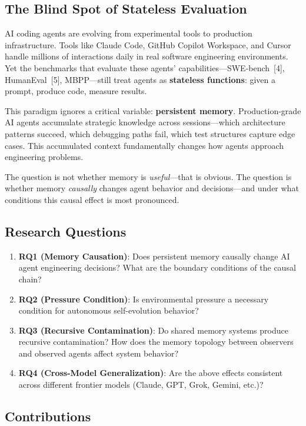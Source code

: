\documentclass[11pt, a4paper]{article}
\begin{document}
\subsection{The Blind Spot of Stateless Evaluation}

AI coding agents are evolving from experimental tools to production infrastructure. Tools like Claude Code, GitHub Copilot Workspace, and Cursor handle millions of interactions daily in real software engineering environments. Yet the benchmarks that evaluate these agents' capabilities---SWE-bench~[4], HumanEval~[5], MBPP---still treat agents as \textbf{stateless functions}: given a prompt, produce code, measure results.

This paradigm ignores a critical variable: \textbf{persistent memory}. Production-grade AI agents accumulate strategic knowledge across sessions---which architecture patterns succeed, which debugging paths fail, which test structures capture edge cases. This accumulated context fundamentally changes how agents approach engineering problems.

The question is not whether memory is \textit{useful}---that is obvious. The question is whether memory \textit{causally} changes agent behavior and decisions---and under what conditions this causal effect is most pronounced.

\subsection{Research Questions}

\begin{enumerate}
  \item \textbf{RQ1 (Memory Causation)}: Does persistent memory causally change AI agent engineering decisions? What are the boundary conditions of the causal chain?
  \item \textbf{RQ2 (Pressure Condition)}: Is environmental pressure a necessary condition for autonomous self-evolution behavior?
  \item \textbf{RQ3 (Recursive Contamination)}: Do shared memory systems produce recursive contamination? How does the memory topology between observers and observed agents affect system behavior?
  \item \textbf{RQ4 (Cross-Model Generalization)}: Are the above effects consistent across different frontier models (Claude, GPT, Grok, Gemini, etc.)?
\end{enumerate}

\subsection{Contributions}
\end{document}
